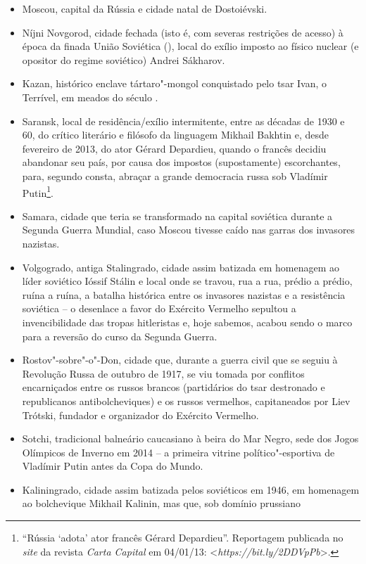 \begin{itemize}
\item
Moscou, capital da Rússia e cidade natal de Dostoiévski.
\item
Níjni Novgorod, cidade fechada (isto é, com severas restrições de
acesso) à época da finada União Soviética (), local do exílio
imposto ao físico nuclear (e opositor do regime soviético) Andrei
Sákharov.
\item
Kazan, histórico enclave tártaro"-mongol conquistado pelo tsar Ivan, o
Terrível, em meados do século .
\item
Saransk, local de residência/exílio intermitente, entre as décadas de
1930 e 60, do crítico literário e filósofo da linguagem Mikhail Bakhtin
e, desde fevereiro de 2013, do ator Gérard Depardieu, quando o francês
decidiu abandonar seu país, por causa dos impostos (supostamente)
escorchantes, para, segundo consta, abraçar a grande democracia russa
sob Vladímir Putin\footnote{``Rússia `adota' ator francês Gérard
  Depardieu''. Reportagem publicada no \emph{site} da revista
  \emph{Carta Capital} em 04/01/13: \textless{}\emph{https://bit.ly/2DDVpPb}\textgreater{}.}.
\item
Samara, cidade que teria se transformado na capital soviética durante a
Segunda Guerra Mundial, caso Moscou tivesse caído nas garras dos
invasores nazistas.
\item
Volgogrado, antiga Stalingrado, cidade assim batizada em homenagem ao
líder soviético Ióssif Stálin e local onde se travou, rua a rua, prédio
a prédio, ruína a ruína, a batalha histórica entre os invasores nazistas
e a resistência soviética -- o desenlace a favor do Exército Vermelho
sepultou a invencibilidade das tropas hitleristas e, hoje sabemos,
acabou sendo o marco para a reversão do curso da Segunda Guerra.
\item
Rostov"-sobre"-o"-Don, cidade que, durante a guerra civil que se seguiu à
Revolução Russa de outubro de 1917, se viu tomada por conflitos
encarniçados entre os russos brancos (partidários do tsar destronado e
republicanos antibolcheviques) e os russos vermelhos, capitaneados por
Liev Trótski, fundador e organizador do Exército Vermelho.
\item
Sotchi, tradicional balneário caucasiano à beira do Mar Negro, sede dos
Jogos Olímpicos de Inverno em 2014 -- a primeira vitrine
político"-esportiva de Vladímir Putin antes da Copa do Mundo.
\item
Kaliningrado, cidade assim batizada pelos soviéticos em 1946, em
homenagem ao bolchevique Mikhail Kalinin, mas que, sob domínio prussiano

\end{itemize}
